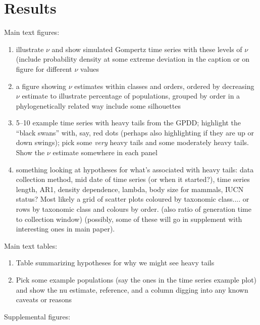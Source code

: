 \documentclass[10pt]{article}
\begin{document}
\section*{Results}

Main text figures:

\begin{enumerate}
\item illustrate $\nu$ and show simulated Gompertz time series with these levels of $\nu$ (include probability density at some extreme deviation in the caption or on figure for different $\nu$ values

\item a figure showing $\nu$ estimates within classes and  orders, ordered by decreasing $\nu$ estimate to illustrate percentage of populations, grouped by order in a phylogenetically related way include some silhouettes

\item 5--10 example time series with heavy tails from the GPDD; highlight the ``black swans'' with, say, red dots (perhaps also highlighting if they are up or down swings); pick some \textit{very} heavy tails and some moderately heavy tails. Show the $\nu$ estimate somewhere in each panel

\item something looking at hypotheses for what's associated with heavy tails: data collection method, mid date of time series (or when it started?), time series length, AR1, density dependence, lambda, body size for mammals, IUCN status? Most likely a grid of scatter plots coloured by taxonomic class.... or rows by taxonomic class and colours by order. (also ratio of generation time to collection window) (possibly, some of these will go in supplement with interesting ones in main paper).

\end{enumerate}

Main text tables:

\begin{enumerate}
\item Table summarizing hypotheses for why we might see heavy tails
\item Pick some example populations (say the ones in the time series example plot) and show the nu estimate, reference, and a column digging into any known caveats or reasons
\end{enumerate}

Supplemental figures:
\end{document}
